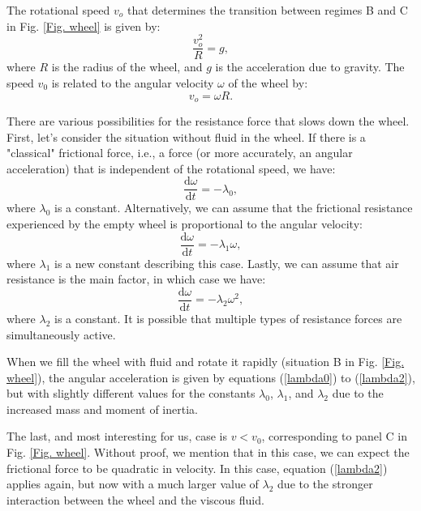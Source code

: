 \documentclass{article}
\begin{document}
The rotational speed $v_o$ that determines the transition between regimes B and C in Fig. \ref{Fig. wheel} is given by:
\begin{equation}
    \frac{v_o^2}{R} = g, \label{eq:centrifuge}
\end{equation}
where $R$ is the radius of the wheel, and $g$ is the acceleration due to gravity. The speed $v_0$ is related to the angular velocity $\omega$ of the wheel by:
\begin{equation}
    v_o = \omega R. \label{eq:v0=omegaR}
\end{equation}

There are various possibilities for the resistance force that slows down the wheel. First, let's consider the situation without fluid in the wheel. If there is a "classical" frictional force, i.e., a force (or more accurately, an angular acceleration) that is independent of the rotational speed, we have:
\begin{equation}
    \frac{\mathrm{d} \omega}{\mathrm{d} t} = - \lambda_0, 
    \label{lambda0}
\end{equation}
where $\lambda_0$ is a constant.
Alternatively, we can assume that the frictional resistance experienced by the empty wheel is proportional to the angular velocity:
\begin{equation}
    \frac{\mathrm{d} \omega}{\mathrm{d} t} = - \lambda_1 \omega, \label{lambda1}
\end{equation}
where $\lambda_1$ is a new constant describing this case.
Lastly, we can assume that air resistance is the main factor, in which case we have:
\begin{equation}
    \frac{\mathrm{d} \omega}{\mathrm{d} t} = - \lambda_2 \omega^2, 
    \label{lambda2}
\end{equation}
where $\lambda_2$ is a constant. It is possible that multiple types of resistance forces are simultaneously active.

When we fill the wheel with fluid and rotate it rapidly (situation B in Fig. \ref{Fig. wheel}), the angular acceleration is given by equations (\ref{lambda0}) to (\ref{lambda2}), but with slightly different values for the constants $\lambda_0$, $\lambda_1$, and $\lambda_2$ due to the increased mass and moment of inertia.

The last, and most interesting for us, case is $v < v_0$, corresponding to panel C in Fig. \ref{Fig. wheel}. Without proof, we mention that in this case, we can expect the frictional force to be quadratic in velocity. In this case, equation (\ref{lambda2}) applies again, but now with a much larger value of $\lambda_2$ due to the stronger interaction between the wheel and the viscous fluid.
\end{document}
